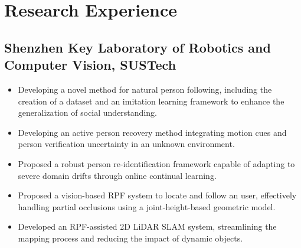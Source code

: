 \documentclass[12pt,a4paper,sans]{moderncv} %
\begin{document}


















\section{Research Experience}
\subsection{Shenzhen Key Laboratory of Robotics and Computer Vision, SUSTech}
{
  \begin{itemize}
    \item Developing a novel method for natural person following, including the creation of a dataset and an imitation learning framework to enhance the generalization of social understanding.
    \item Developing an active person recovery method integrating motion cues and person verification uncertainty in an unknown environment.
    \item Proposed a robust person re-identification framework capable of adapting to severe domain drifts through online continual learning.
    \item Proposed a vision-based RPF system to locate and follow an user, effectively handling partial occlusions using a joint-height-based geometric model.
    \item Developed an RPF-assisted 2D LiDAR SLAM system, streamlining the mapping process and reducing the impact of dynamic objects.
  \end{itemize}
}
\end{document}
